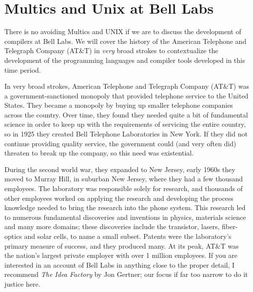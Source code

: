 







\section{Multics and Unix at Bell Labs}

There is no avoiding Multics and UNIX if we are to discuss the development of compilers at Bell Labs.
We will cover the history of the American Telephone and Telegraph Company (AT\&T)
in \textit{very} broad strokes to contextualize the development of the programming languages
and compiler tools developed in this time period.

In very broad strokes, American Telephone and Telegraph Company (AT\&T) was a government-sanctioned
monopoly that provided telephone service to the United States.
They became a monopoly by buying up smaller telephone companies across the country.
Over time, they found they needed quite a bit of fundamental science in order to keep up with the
requirements of servicing the entire country, so in 1925 they created Bell Telephone
Laboratories in New York. If they did not continue providing quality service, the government could
(and very often did) threaten to break up the company, so this need was existential.

During the second world war, they expanded to New Jersey, early 1960s they moved to Murray Hill,
in suburban New Jersey, where they had a few thousand employees.
The laboratory was responsible solely for research, and thousands of other employees
worked on applying the research and developing the process knowledge needed to bring the
research into the phone system.
This research led to numerous fundamental discoveries and inventions in physics,
materials science and many more domains; these discoveries include the transistor, lasers,
fiber-optics and solar cells, to name a small subset.
Patents were the laboratory's primary measure of success, and they produced many.
At its peak, AT\&T was the nation's largest private employer with over 1 million employees.
If you are interested in an account of Bell Labs in anything close to the proper detail,
I recommend \textit{The Idea Factory} by Jon Gertner; our focus if far too narrow to do
it justice here.

